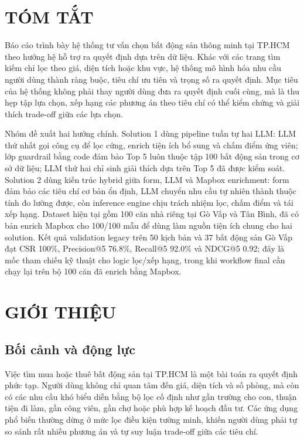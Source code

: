 \documentclass[a4paper,12pt]{article}
\begin{document}
\newpage
\tableofcontents
\newpage
{}

\section*{TÓM TẮT}
Báo cáo trình bày hệ thống tư vấn chọn bất động sản thông minh tại TP.HCM theo hướng hệ hỗ trợ ra quyết định dựa trên dữ liệu. Khác với các trang tìm kiếm chỉ lọc theo giá, diện tích hoặc khu vực, hệ thống mô hình hóa nhu cầu người dùng thành ràng buộc, tiêu chí ưu tiên và trọng số ra quyết định. Mục tiêu của hệ thống không phải thay người dùng đưa ra quyết định cuối cùng, mà là thu hẹp tập lựa chọn, xếp hạng các phương án theo tiêu chí có thể kiểm chứng và giải thích trade-off giữa các lựa chọn.

Nhóm đề xuất hai hướng chính. Solution 1 dùng pipeline tuần tự hai LLM: LLM thứ nhất gọi công cụ để lọc cứng, enrich tiện ích bổ sung và chấm điểm ứng viên; lớp guardrail bằng code đảm bảo Top 5 luôn thuộc tập 100 bất động sản trong cơ sở dữ liệu; LLM thứ hai chỉ sinh giải thích dựa trên Top 5 đã được kiểm soát. Solution 2 dùng kiến trúc hybrid giữa form, LLM và Mapbox enrichment: form đảm bảo các tiêu chí cơ bản ổn định, LLM chuyển nhu cầu tự nhiên thành thuộc tính đo lường được, còn inference engine chịu trách nhiệm lọc, chấm điểm và tái xếp hạng. Dataset hiện tại gồm 100 căn nhà riêng tại Gò Vấp và Tân Bình, đã có bản enrich Mapbox cho 100/100 mẫu để dùng làm nguồn tiện ích chung cho hai solution. Kết quả validation legacy trên 50 kịch bản và 37 bất động sản Gò Vấp đạt CSR 100\%, Precision@5 76.8\%, Recall@5 92.0\% và NDCG@5 0.92; đây là mốc tham chiếu kỹ thuật cho logic lọc/xếp hạng, trong khi workflow final cần chạy lại trên bộ 100 căn đã enrich bằng Mapbox.

\section{GIỚI THIỆU}

\subsection{Bối cảnh và động lực}
Việc tìm mua hoặc thuê bất động sản tại TP.HCM là một bài toán ra quyết định phức tạp. Người dùng không chỉ quan tâm đến giá, diện tích và số phòng, mà còn có các nhu cầu khó biểu diễn bằng bộ lọc cố định như gần trường cho con, thuận tiện đi làm, gần công viên, gần chợ hoặc phù hợp kế hoạch đầu tư. Các ứng dụng phổ biến thường dừng ở mức lọc điều kiện tường minh, khiến người dùng phải tự so sánh rất nhiều phương án và tự suy luận trade-off giữa các tiêu chí.
\end{document}
